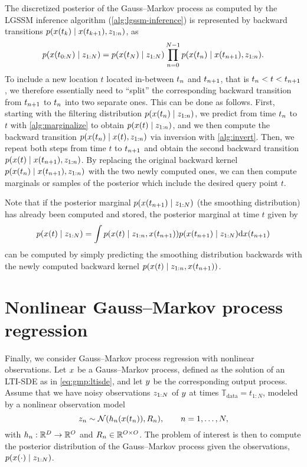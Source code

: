 \documentclass{mimosis}
\begin{document}
The discretized posterior of the Gauss--Markov process as computed by the LGSSM inference algorithm (\ref{alg:lgssm-inference}) is represented by backward transitions
\(\p(\st(t_k) \mid \st(t_{k+1}), \obs_{1:\idxt})\), as
\begin{equation}
  \p(\st(t_{0:N}) \mid \obs_{1:N}) = \p(\st(t_{N}) \mid \obs_{1:N}) \prod_{\idxt=0}^{N-1} \p(\st(t_\idxt) \mid \st(t_{\idxt+1}), \obs_{1:\idxt}).
\end{equation}
To include a new location \(t\) located in-between \(t_n\) and \(t_{n+1}\), that is \(t_n < t < t_{n+1}\),
we therefore essentially need to ``split'' the corresponding backward transition from \(t_{n+1}\) to \(t_n\) into two separate ones.
This can be done as follows.
First,
starting with the filtering distribution \(\p(\st(t_\idxt) \mid \obs_{1:\idxt})\),
we predict from time \(t_n\) to \(t\)
with \cref{alg:marginalize}
to obtain \(\p(\st(t) \mid \obs_{1:\idxt})\),
and we then compute the backward transition
\(\p(\st(t_\idxt) \mid \st(t), \obs_{1:\idxt})\)
via inversion with \cref{alg:invert}.
Then, we repeat both steps from time \(t\) to \(t_{n+1}\) and obtain the second backward transition
\(\p(\st(t) \mid \st(t_{\idxt+1}), \obs_{1:\idxt})\).
By replacing the original backward kernel
\(\p(\st(t_\idxt) \mid \st(t_{\idxt+1}), \obs_{1:\idxt})\) with the two newly computed ones, we can then compute marginals or samples of the posterior which include the desired query point \(t\).

Note that if the posterior marginal \(\p(\st(t_{\idxt+1}) \mid \obs_{1:N})\) (the smoothing distribution) has already been computed and stored, the posterior marginal at time \(t\) given by
\begin{equation}
  \p(\st(t) \mid \obs_{1:N}) = \int \p(\st(t) \mid \obs_{1:\idxt}, \st(t_{\idxt+1})) \p(\st(t_{\idxt+1}) \mid \obs_{1:N}) \dd \st(t_{\idxt+1})
\end{equation}
can be computed by simply predicting the smoothing distribution backwards with the newly computed backward kernel
\(\p(\st(t) \mid \obs_{1:\idxt}, \st(t_{\idxt+1}))\).
\section{Nonlinear Gauss--Markov process regression}
\label{sec:org9aa0fff}
\label{sec:nonlinear-gmp-regression}
Finally, we consider Gauss--Markov process regression with nonlinear observations.
Let \(x\) be a Gauss--Markov process, defined as the solution of an LTI-SDE as in \cref{eq:gmp:ltisde}, and let \(y\) be the corresponding output process.
Assume that we have noisy observations \(z_{1:N}\) of \(y\) at times \(\mathbb{T}_\text{data} = t_{1:N}\), modeled by a nonlinear observation model
\begin{equation}
  \sobs_\idxt \sim \N( \obsh_\idxt(\st(t_\idxt)), \obsC_\idxt ), \qquad \idxt = 1, \dots, N,
\end{equation}
with
\(h_n: \mathbb{R}^D \to \mathbb{R}^O\)
and
\(R_n \in \mathbb{R}^{O \times O}\).
The problem of interest is then to compute the posterior distribution of the Gauss--Markov process given the observations, \(\p(\st(\cdot) \mid \sobs_{1:N})\).
\end{document}
